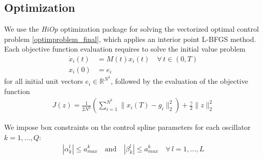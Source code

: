 \documentclass[letterpaper]{article}
\newcommand{\R}{\mathds{R}}
\begin{document}
  \subsection{Optimization}
    We use the \textit{HiOp} optimization package for solving the vectorized optimal control problem \eqref{optimproblem_final}, which applies an interior point L-BFGS method. Each objective function evaluation requires to solve the initial value problem  
        \begin{align*}
          \dot x_i(t) &= M(t) x_i(t) \quad \forall \, t\in (0,T) \\
          x_i(0) &= e_i
        \end{align*}
        for all initial unit vectors $e_i \in \R^{N^2}$, followed by the evaluation of the objective function 
        \begin{align}
          J(z) = \frac{1}{2N^2} \left(\sum_{i=1}^{N^2} \|x_i(T) - g_i\|^2_2  \right) + \frac{\gamma}{2} \| z\|^2_2
        \end{align}

    We impose box constraints on the control spline parameters for each oscillator $k=1,\dots, Q$:
        \begin{align}
          | \alpha^l_k| \leq a_{max}^k \quad \text{and} \quad | \beta^l_k|  \leq a_{max}^k \quad \forall \, l=1,\dots, L 
        \end{align}
\end{document}
